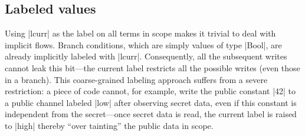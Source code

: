 %
%

\subsection{Labeled values}

Using |lcurr| as the label on all terms in scope makes it trivial to deal with
implicit flows. Branch conditions, which are simply values of type |Bool|, are
already implicitly labeled with |lcurr|. Consequently, all the subsequent writes cannot leak
this bit---the current label restricts all the possible writes (even those in
a branch).
%
%
This coarse-grained labeling approach suffers from a severe restriction: a piece
of code cannot, for example, %
write the public
constant |42| to a public channel labeled |low| after observing secret
data, even if this constant is independent from the secret---once secret data is read, the current label is raised to |high| thereby
``over tainting'' the public data in scope.

